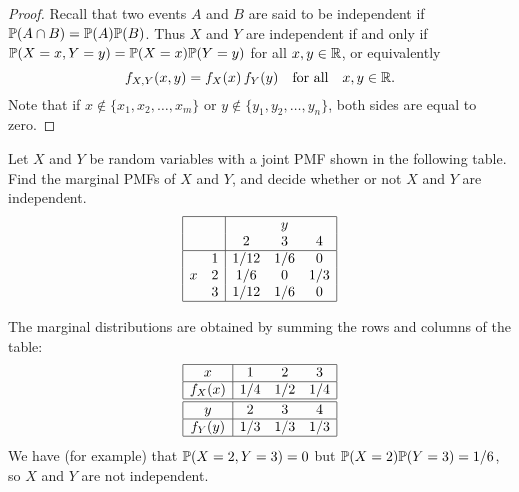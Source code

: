 \begin{proof} 
Recall that two events $A$ and $B$ are said to be independent if $\mathbb{P}(A\cap B)=\mathbb{P}(A)\mathbb{P}(B)$. Thus $X$ and $Y$ are independent if and only if $\mathbb{P}(X=x, Y=y) = \mathbb{P}(X=x)\mathbb{P}(Y=y)$ for all $x,y\in\mathbb{R}$, or equivalently
\[
f_{X,Y}(x,y) = f_X(x)\,f_Y(y) \quad\text{for all}\quad x,y\in\mathbb{R}.
\]
Note that if $x\notin\{x_1,x_2,\ldots,x_m\}$ or $y\notin\{y_1,y_2,\ldots,y_n\}$, both sides are equal to zero.
\end{proof} 


\begin{example}\label{ex:tedious}
Let $X$ and $Y$ be random variables with a joint PMF shown in the following table. 
Find the marginal PMFs of $X$ and $Y$, and decide whether or not $X$ and $Y$ are independent.
\[\begin{array}{|cc|ccc|}\hline
	&	& 		& y 		&			\\ 
	&	& 2		& 3		& 4		\\\hline
	& 1	& 1/12	& 1/6	& 0 		\\
x	& 2	& 1/6	& 0		& 1/3 	\\
	& 3	& 1/12	& 1/6  	& 0		\\ \hline
\end{array}\]
\end{example}

\begin{solution}
The marginal distributions are obtained by summing the rows and columns of the table:
\[\begin{array}{|c|ccc|}\hline
x			& 1		& 2		& 3	\\ \hline
f_X(x)		& 1/4	& 1/2	& 1/4	\\ \hline \hline
y			& 2		& 3		& 4 	\\ \hline			
f_Y(y)		& 1/3	& 1/3	& 1/3	\\ \hline
\end{array}\]
We have (for example) that $\mathbb{P}(X=2,Y=3)=0$ but $\mathbb{P}(X=2)\mathbb{P}(Y=3) = 1/6$, so $X$ and $Y$ are not independent.
\end{solution}

